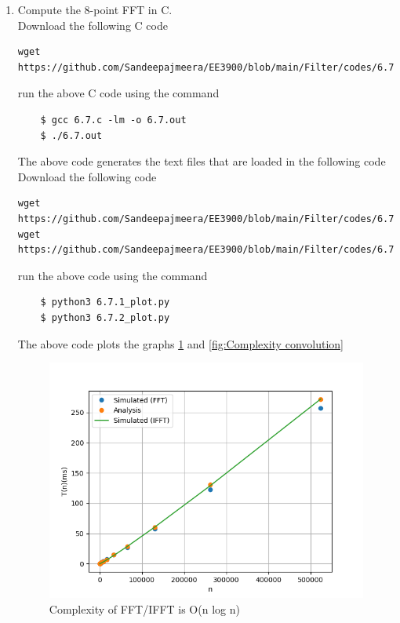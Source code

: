 \documentclass[journal,12pt,twocolumn]{IEEEtran}
\renewcommand\thesection{\arabic{section}}
\begin{document}
\begin{enumerate}[label=\thesection.\arabic*
,ref=\thesection.\theenumi]
\item Compute the 8-point FFT in C.\\
\solution Download the following C code 
\begin{lstlisting}
wget https://github.com/Sandeepajmeera/EE3900/blob/main/Filter/codes/6.7.c
\end{lstlisting}
run the above C code using the command
\begin{lstlisting}
	$ gcc 6.7.c -lm -o 6.7.out
	$ ./6.7.out
\end{lstlisting}
The above code generates the text files that are loaded in the following code \\
Download the following code 
\begin{lstlisting}
wget https://github.com/Sandeepajmeera/EE3900/blob/main/Filter/codes/6.7.1_plot.py
wget https://github.com/Sandeepajmeera/EE3900/blob/main/Filter/codes/6.7.2_plot.py
\end{lstlisting}
run the above code using the command
\begin{lstlisting}
	$ python3 6.7.1_plot.py
	$ python3 6.7.2_plot.py
\end{lstlisting}
The above code plots the graphs \ref{fig:complexity fft/ifft} and \ref{fig:Complexity convolution}
\begin{figure}
\centering
\includegraphics[width=\columnwidth]{figs/6.7.1_plot.png}
\caption{Complexity of FFT/IFFT is O(n log n)}
\label{fig:complexity fft/ifft}
\end{figure}


\end{enumerate}
\end{document}
